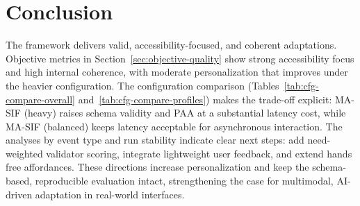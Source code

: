 \section{Conclusion}
The framework delivers valid, accessibility-focused, and coherent adaptations. Objective metrics in Section~\ref{sec:objective-quality} show strong accessibility focus and high internal coherence, with moderate personalization that improves under the heavier configuration. The configuration comparison (Tables~\ref{tab:cfg-compare-overall} and~\ref{tab:cfg-compare-profiles}) makes the trade-off explicit: MA-SIF (heavy) raises schema validity and PAA at a substantial latency cost, while MA-SIF (balanced) keeps latency acceptable for asynchronous interaction. The analyses by event type and run stability indicate clear next steps: add need-weighted validator scoring, integrate lightweight user feedback, and extend hands free affordances. These directions increase personalization and keep the schema-based, reproducible evaluation intact, strengthening the case for multimodal, AI-driven adaptation in real-world interfaces.